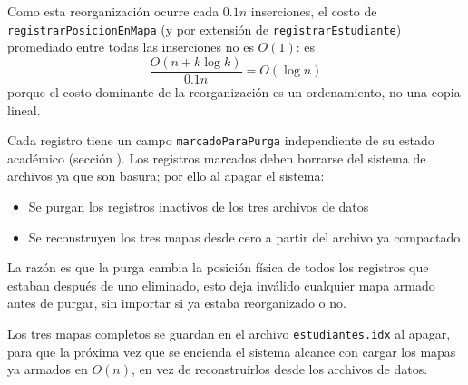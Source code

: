 Como esta reorganización ocurre cada $0.1n$ inserciones, el costo de \texttt{registrarPosicionEnMapa} (y por extensión de \texttt{registrarEstudiante}) promediado entre todas las inserciones no es $O(1)$: es
\[
\frac{O(n + k\log k)}{0.1n} = O(\log n)
\]
porque el costo dominante de la reorganización es un ordenamiento, no una copia lineal.

Cada registro tiene un campo \texttt{marcadoParaPurga} independiente de su estado académico (sección ).
Los registros marcados deben borrarse del sistema de archivos ya que son basura; por ello al apagar el sistema:
\begin{itemize}
    \item Se purgan los registros inactivos de los tres archivos de datos
    \item Se reconstruyen los tres mapas desde cero a partir del archivo ya compactado
\end{itemize}

La razón es que la purga cambia la posición física de todos los registros que estaban después de uno eliminado, 
esto deja inválido cualquier mapa armado antes de purgar, sin importar si ya estaba reorganizado o no.

Los tres mapas completos se guardan en el archivo \texttt{estudiantes.idx} al apagar, para que la próxima vez que se
encienda el sistema alcance con cargar los mapas ya armados en $O(n)$, en vez de reconstruirlos desde los archivos de datos.
